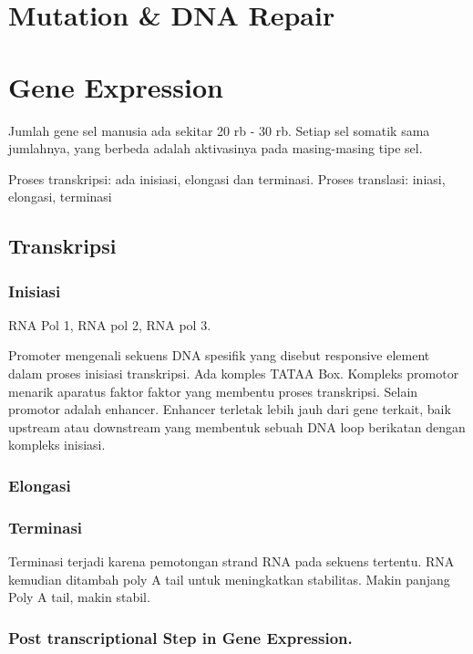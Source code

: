 \documentclass[
  letterpaper,
  DIV=11,
  numbers=noendperiod]{scrreprt}
\begin{document}
\section{Mutation \& DNA Repair}\label{mutation-dna-repair}

\section{Gene Expression}\label{gene-expression}

Jumlah gene sel manusia ada sekitar 20 rb - 30 rb. Setiap sel somatik
sama jumlahnya, yang berbeda adalah aktivasinya pada masing-masing tipe
sel.

Proses transkripsi: ada inisiasi, elongasi dan terminasi. Proses
translasi: iniasi, elongasi, terminasi

\subsection{Transkripsi}\label{transkripsi}

\subsubsection{Inisiasi}\label{inisiasi}

RNA Pol 1, RNA pol 2, RNA pol 3.

Promoter mengenali sekuens DNA spesifik yang disebut responsive element
dalam proses inisiasi transkripsi. Ada komples TATAA Box. Kompleks
promotor menarik aparatus faktor faktor yang membentu proses
transkripsi. Selain promotor adalah enhancer. Enhancer terletak lebih
jauh dari gene terkait, baik upstream atau downstream yang membentuk
sebuah DNA loop berikatan dengan kompleks inisiasi.

\subsubsection{Elongasi}\label{elongasi}

\subsubsection{Terminasi}\label{terminasi}

Terminasi terjadi karena pemotongan strand RNA pada sekuens tertentu.
RNA kemudian ditambah poly A tail untuk meningkatkan stabilitas. Makin
panjang Poly A tail, makin stabil.

\subsubsection{Post transcriptional Step in Gene
Expression.}\label{post-transcriptional-step-in-gene-expression.}
\end{document}
